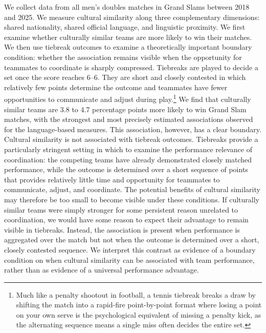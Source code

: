 \documentclass[10pt]{article}
\begin{document}
We collect data from all men's doubles matches in Grand Slams between 2018 and 2025. We measure cultural similarity along three complementary dimensions: shared nationality, shared official language, and linguistic proximity. We first examine whether culturally similar teams are more likely to win their matches. We then use tiebreak outcomes to examine a theoretically important boundary condition: whether the association remains visible when the opportunity for teammates to coordinate is sharply compressed. Tiebreaks are played to decide a set once the score reaches 6--6. They are short and closely contested in which relatively few points determine the outcome and teammates have fewer opportunities to communicate and adjust during play.\footnote{Much like a penalty shootout in football, a tennis tiebreak breaks a draw by shifting the match into a rapid-fire point-by-point format where losing a point on your own serve is the psychological equivalent of missing a penalty kick, as the alternating sequence means a single miss often decides the entire set.}
We find that culturally similar teams are 3.8 to 4.7 percentage points more likely to win Grand Slam matches, with the strongest and most precisely estimated associations observed for the language-based measures. This association, however, has a clear boundary. Cultural similarity is not associated with tiebreak outcomes. Tiebreaks provide a particularly stringent setting in which to examine the performance relevance of coordination: the competing teams have already demonstrated closely matched performance, while the outcome is determined over a short sequence of points that provides relatively little time and opportunity for teammates to communicate, adjust, and coordinate. The potential benefits of cultural similarity may therefore be too small to become visible under these conditions. If culturally similar teams were simply stronger for some persistent reason unrelated to coordination, we would have some reason to expect their advantage to remain visible in tiebreaks. Instead, the association is present when performance is aggregated over the match but not when the outcome is determined over a short, closely contested sequence. We interpret this contrast as evidence of a boundary condition on when cultural similarity can be associated with team performance, rather than as evidence of a universal performance advantage.
\end{document}
